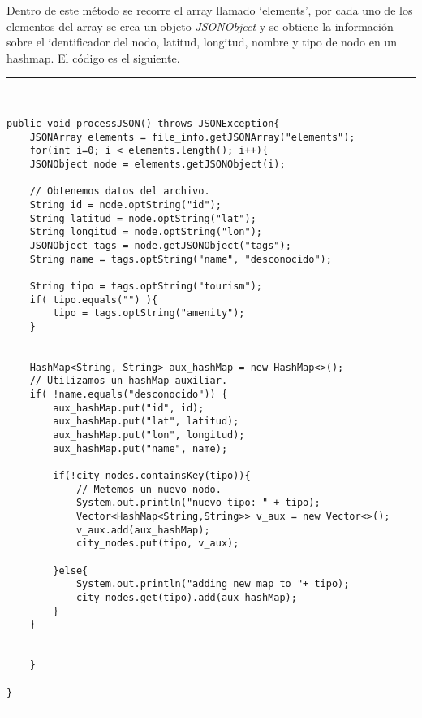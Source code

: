 Dentro de este método se recorre el array llamado \enquote*{elements}, por cada uno de los elementos del array se crea un objeto \textit{JSONObject} y se obtiene la información sobre el identificador del nodo, latitud, longitud, nombre y tipo de nodo en un hashmap. El código es el siguiente.\newline
\newpage
\noindent\rule[-1ex]{\textwidth}{1pt}\\
\begin{lstlisting}[caption=Función para procesar información sobre POIs y alojamientos.]
public void processJSON() throws JSONException{
	JSONArray elements = file_info.getJSONArray("elements");
	for(int i=0; i < elements.length(); i++){
	JSONObject node = elements.getJSONObject(i);
	
	// Obtenemos datos del archivo.
	String id = node.optString("id");
	String latitud = node.optString("lat");
	String longitud = node.optString("lon");
	JSONObject tags = node.getJSONObject("tags");
	String name = tags.optString("name", "desconocido");
	
	String tipo = tags.optString("tourism");
	if( tipo.equals("") ){
		tipo = tags.optString("amenity");
	}
	
	
	HashMap<String, String> aux_hashMap = new HashMap<>();
	// Utilizamos un hashMap auxiliar.
	if( !name.equals("desconocido")) {
		aux_hashMap.put("id", id);
		aux_hashMap.put("lat", latitud);
		aux_hashMap.put("lon", longitud);
		aux_hashMap.put("name", name);
		
		if(!city_nodes.containsKey(tipo)){
			// Metemos un nuevo nodo.
			System.out.println("nuevo tipo: " + tipo);
			Vector<HashMap<String,String>> v_aux = new Vector<>();
			v_aux.add(aux_hashMap);
			city_nodes.put(tipo, v_aux);
		
		}else{
			System.out.println("adding new map to "+ tipo);
			city_nodes.get(tipo).add(aux_hashMap);
		}
	}
	
	
	}

}
\end{lstlisting}
\noindent\rule[-1ex]{\textwidth}{1pt}\\


